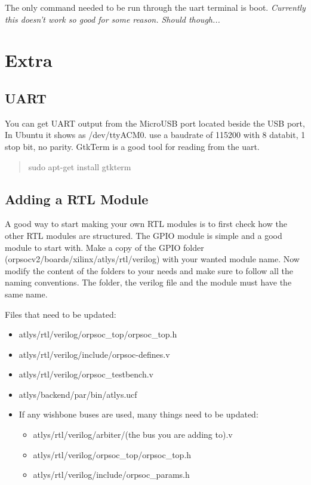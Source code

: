\documentclass[10pt,a4paper]{article}
\begin{document}
The only command needed to be run through the uart terminal is boot. \textit{Currently this doesn't work so good for some reason. Should though...}

\section{Extra}

\subsection{UART}
You can get UART output from the MicroUSB port located beside the USB port, In Ubuntu it shows as /dev/ttyACM0.
use a baudrate of 115200 with 8 databit, 1 stop bit, no parity. GtkTerm is a good tool for reading from the uart. 
\begin{quote}
sudo apt-get install gtkterm
\end{quote}

\subsection{Adding a RTL Module}

A good way to start making your own RTL modules is to first check how the other RTL modules are structured. The GPIO module is simple and a good module to start with. Make a copy of the GPIO folder (orpsocv2/boards/xilinx/atlys/rtl/verilog) with your wanted module name. Now modify the content of the folders to your needs and make sure to follow all the naming conventions. The folder, the verilog file and the module must have the same name.

Files that need to be updated:
\begin{itemize}
\item atlys/rtl/verilog/orpsoc\_top/orpsoc\_top.h
\item atlys/rtl/verilog/include/orpsoc-defines.v
\item atlys/rtl/verilog/orpsoc\_testbench.v 
\item atlys/backend/par/bin/atlys.ucf
\item If any wishbone buses are used, many things need to be updated:
\begin{itemize}
\item atlys/rtl/verilog/arbiter/(the bus you are adding to).v
\item atlys/rtl/verilog/orpsoc\_top/orpsoc\_top.h
\item atlys/rtl/verilog/include/orpsoc\_params.h
\end{itemize}
\end{itemize}
\end{document}
